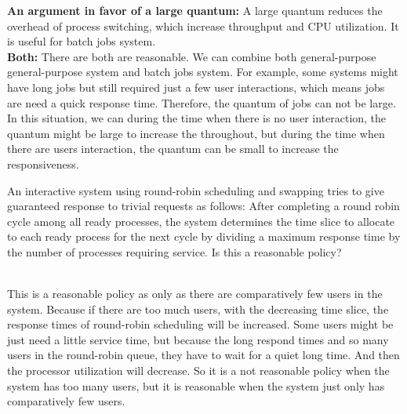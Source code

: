 \documentclass[12pt]{article}
\newenvironment{sol}[1][Solution]{\begin{trivlist}\item[\hskip\labelsep {\bfseries #1:}]}{\end{trivlist}}
\begin{document}
\begin{enumerate}
\begin{sol}
    \textbf{An argument in favor of a large quantum:} A large quantum reduces the overhead of process switching, which increase throughput and CPU utilization. It is useful for batch jobs system. \\
    
    \textbf{Both:} There are both are reasonable. We can combine both general-purpose general-purpose system and batch jobs system. For example, some systems might have long jobs but still required just a few user interactions, which means jobs are need a quick response time. Therefore, the quantum of jobs can not be large. In this situation, we can during the time when there is no user interaction, the quantum might be large to increase the throughout, but during the time when there are users interaction, the quantum can be small to increase the responsiveness.





    \end{sol}

    \newpage
    \item An interactive system using round-robin scheduling and swapping tries to give guaranteed response to trivial requests as follows: After completing a round robin cycle among all ready processes, the system determines the time slice to allocate to each ready process for the next cycle by dividing a maximum response time by the number of processes requiring service. Is this a reasonable policy?
    \begin{sol}
    \hspace*{\fill}\\
    This is a reasonable policy as only as there are comparatively few users in the system. Because if there are too much users, with the decreasing time slice, the response times of round-robin scheduling will be increased. Some users might be just need a little service time, but because the long respond times and so many users in the round-robin queue, they have to wait for a quiet long time. And then the processor utilization will decrease. So it is a not reasonable policy when the system has too many users, but it is reasonable when the system just only has comparatively few users.
    
    \end{sol}


\end{enumerate}
\end{document}
